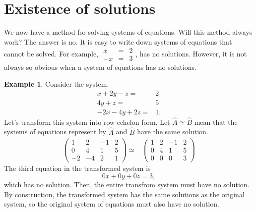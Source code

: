 \documentclass[12pt,reqno]{amsart}
\theoremstyle{definition}
\newtheorem{example}{Example}[section]
\begin{document}
\section{Existence of solutions}

We now have a method for solving systems of equations. Will this
method always work? The answer is no. It is easy to write down systems
of equations that cannot be solved. For example, $\begin{array}{ccc} x
  & = & 2 \\ - x & = & 3 \end{array}$, has no solutions. However, it
is not always so obvious when a system of equations has no solutions. 
\begin{example}
  Consider the system:
  \begin{align*}
    x + 2 y - z = & 2 \\
    4 y + z = & 5 \\
    -2x - 4y + 2z = & 1.
  \end{align*}
  Let's transform this system into row echelon form. Let $\hat{A}
  \simeq \hat{B}$ mean that the systems of equations represent by
  $\hat{A}$ and $\hat{B}$ have the same solution.
  \begin{align*}
    \begin{pmatrix} 
      1 & 2 & -1 & 2 \\
      0 & 4 & 1 & 5 \\ 
      -2 & -4 & 2 & 1 
    \end{pmatrix}  \simeq &     
    \begin{pmatrix} 
      1 & 2 & -1 & 2 \\
      0 & 4 & 1 & 5 \\ 
      0 & 0 & 0 & 3 
    \end{pmatrix} 
  \end{align*}
  The third equation in the transformed system is 
  \[ 0 x + 0y + 0z = 3, \] 
  which has no solution. Then, the entire transfrom system must have
  no solution. By construction, the transformed system has the same
  solutions as the original system, so the original system of
  equations must also have no solution. 
\end{example}
\end{document}
